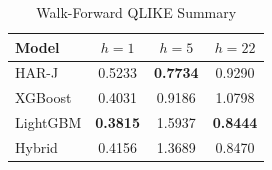 \begin{table}[htbp]
\centering
\caption{Walk-Forward QLIKE Summary}
\label{tab:wf_summary}
\begin{tabular}{lccc}
\hline
Model & $h=1$ & $h=5$ & $h=22$ \\
\hline
HAR-J & 0.5233 & \textbf{0.7734} & 0.9290 \\
XGBoost & 0.4031 & 0.9186 & 1.0798 \\
LightGBM & \textbf{0.3815} & 1.5937 & \textbf{0.8444} \\
Hybrid & 0.4156 & 1.3689 & 0.8470 \\
\hline
\end{tabular}
\end{table}
